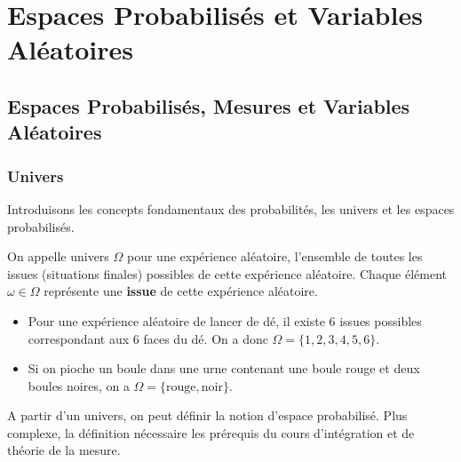 \chapter{Espaces Probabilisés et Variables Aléatoires}

\justify

\setlength{\parindent}{0pt}
\renewcommand{\labelitemi}{\textbullet} %




\section{Espaces Probabilisés, Mesures et Variables Aléatoires}

\subsection{Univers}

Introduisons les concepts fondamentaux des probabilités, les univers et les espaces probabilisés. 

\begin{definition}[Univers]
    On appelle univers $\Omega$ pour une expérience aléatoire, l'ensemble de toutes les issues (situations finales) possibles 
    de cette expérience aléatoire. Chaque élément $ \omega \in \Omega$ représente une \textbf{issue} de cette expérience aléatoire.  
\end{definition}

\begin{example}
    \begin{itemize}
        \item Pour une expérience aléatoire de lancer de dé, il existe 6 issues possibles correspondant aux 6 faces du dé. 
        On a donc $\Omega = \{1, 2, 3, 4, 5, 6\}$. 
        \item Si on pioche un boule dans une urne contenant une boule rouge et deux boules noires, on a 
        $ \Omega = \{\text{rouge}, \text{noir}\}$. 
    \end{itemize}
\end{example}

A partir d'un univers, on peut définir la notion d'espace probabilisé. Plus complexe, la définition nécessaire les prérequis 
du cours d'intégration et de théorie de la mesure. 

